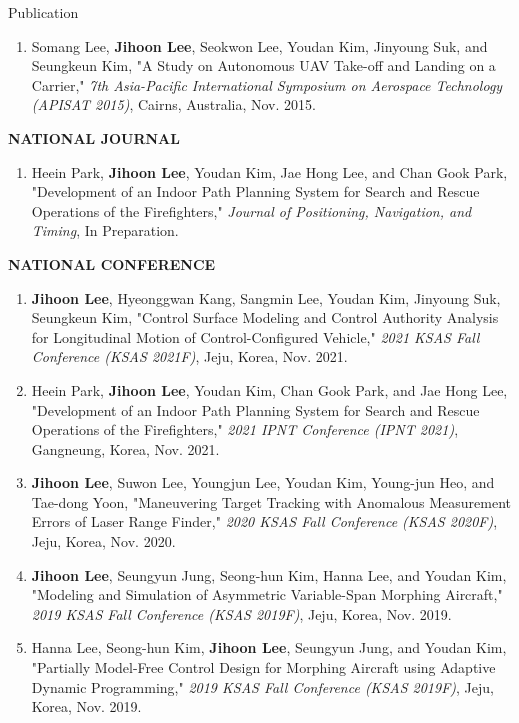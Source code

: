 \documentclass{resume}
\begin{document}
\begin{rSection}{Publication}
\begin{enumerate}
		\item Somang Lee, \textbf{Jihoon Lee}, Seokwon Lee, Youdan Kim, Jinyoung Suk, and Seungkeun Kim, "A Study on Autonomous UAV Take-off and Landing on a Carrier," \textit{7th Asia-Pacific International Symposium on Aerospace Technology (APISAT 2015)}, Cairns, Australia, Nov. 2015. 
	\end{enumerate}\renewcommand{\labelenumi}{\theenumi.}
	
	\textbf{NATIONAL JOURNAL}
	\begin{enumerate}\renewcommand{\labelenumi}{[NJ\theenumi]}
		\item Heein Park, \textbf{Jihoon Lee}, Youdan Kim, Jae Hong Lee, and Chan Gook Park, "Development of an Indoor Path Planning System for Search and Rescue Operations of the Firefighters," \textit{Journal of Positioning, Navigation, and Timing}, In Preparation.
	\end{enumerate}\renewcommand{\labelenumi}{\theenumi.}
	
	\textbf{NATIONAL CONFERENCE}
	\begin{enumerate}\renewcommand{\labelenumi}{[NC\theenumi]}
		\item \textbf{Jihoon Lee}, Hyeonggwan Kang, Sangmin Lee, Youdan Kim, Jinyoung Suk, Seungkeun Kim, "Control Surface Modeling and Control Authority Analysis for Longitudinal Motion of Control-Configured Vehicle," \textit{2021 KSAS Fall Conference (KSAS 2021F)}, Jeju, Korea, Nov. 2021.
		
		\item Heein Park, \textbf{Jihoon Lee}, Youdan Kim, Chan Gook Park, and Jae Hong Lee, "Development of an Indoor Path Planning System for Search and Rescue Operations of the Firefighters," \textit{2021 IPNT Conference (IPNT 2021)}, Gangneung, Korea, Nov. 2021. 
		
		\item \textbf{Jihoon Lee}, Suwon Lee, Youngjun Lee, Youdan Kim, Young-jun Heo, and Tae-dong Yoon, "Maneuvering Target Tracking with Anomalous Measurement Errors of Laser Range Finder," \textit{2020 KSAS Fall Conference (KSAS 2020F)}, Jeju, Korea, Nov. 2020. 
		
		\item \textbf{Jihoon Lee}, Seungyun Jung, Seong-hun Kim, Hanna Lee, and Youdan Kim, "Modeling and Simulation of Asymmetric Variable-Span Morphing Aircraft," \textit{2019 KSAS Fall Conference (KSAS 2019F)}, Jeju, Korea, Nov. 2019. 
		
		\item Hanna Lee, Seong-hun Kim, \textbf{Jihoon Lee}, Seungyun Jung, and Youdan Kim, "Partially Model-Free Control Design for Morphing Aircraft using Adaptive Dynamic Programming," \textit{2019 KSAS Fall Conference (KSAS 2019F)}, Jeju, Korea, Nov. 2019. 
		

\end{enumerate}
\end{rSection}
\end{document}
